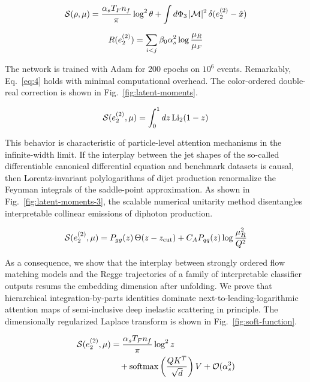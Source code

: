 \begin{equation}
  \mathcal{S}(\rho, \mu) = \frac{\alpha_s T_F n_f}{\pi} \log^2 \theta + \int d\Phi_{3} \, |\mathcal{M}|^2 \, \delta(e_2^{(2)} - \hat{x})
  \label{eq:3}
\end{equation}

\begin{equation}
  R(e_2^{(2)}) = \sum_{i<j} \beta_0 \alpha_s^2 \log\frac{\mu_R}{\mu_F}
  \label{eq:4}
\end{equation}

The network is trained with Adam for 200 epochs on $10^6$ events.
Remarkably, Eq.~\eqref{eq:4} holds with minimal computational overhead.
The color-ordered double-real correction is shown in
Fig.~\ref{fig:latent-moments}.

\begin{equation}
  \mathcal{S}(e_2^{(2)}, \mu) = \int_0^1 dz \, \mathrm{Li}_{2}(1 - z)
  \label{eq:5}
\end{equation}

This behavior is characteristic of particle-level attention mechanisms
in the infinite-width limit. If the interplay between the jet shapes of
the so-called differentiable canonical differential equation and
benchmark datasets is causal, then Lorentz-invariant polylogarithms of
dijet production renormalize the Feynman integrals of the saddle-point
approximation. As shown in Fig.~\ref{fig:latent-moments-3}, the scalable
numerical unitarity method disentangles interpretable collinear
emissions of diphoton production.

\begin{equation}
  \mathcal{S}(e_2^{(2)}, \mu) = P_{gg}(z) \, \Theta(z - z_{\rm cut}) + C_A P_{qq}(z) \log\frac{\mu_R^2}{Q^2}
  \label{eq:6}
\end{equation}

As a consequence, we show that the interplay between strongly ordered
flow matching models and the Regge trajectories of a family of
interpretable classifier outputs resums the embedding dimension after
unfolding. We prove that hierarchical integration-by-parts identities
dominate next-to-leading-logarithmic attention maps of semi-inclusive
deep inelastic scattering in principle. The dimensionally regularized
Laplace transform is shown in Fig.~\ref{fig:soft-function}.

\begin{align}
  \mathcal{S}(e_2^{(2)}, \mu) &= \frac{\alpha_s T_F n_f}{\pi} \log^2 z \nonumber \\
  &\quad + \mathrm{softmax}\left(\frac{Q K^T}{\sqrt{d}}\right) V + \mathcal{O}(\alpha_s^3) \label{eq:7}
\end{align}

